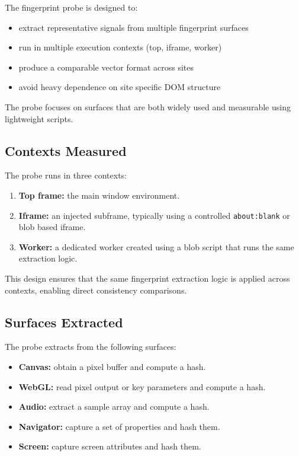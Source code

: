 \documentclass[11pt]{report}
\begin{document}
The fingerprint probe is designed to:

\begin{itemize}
    \item extract representative signals from multiple fingerprint surfaces
    \item run in multiple execution contexts (top, iframe, worker)
    \item produce a comparable vector format across sites
    \item avoid heavy dependence on site specific DOM structure
\end{itemize}

The probe focuses on surfaces that are both widely used and measurable using lightweight scripts.

\subsection{Contexts Measured}

The probe runs in three contexts:

\begin{enumerate}
    \item \textbf{Top frame:} the main window environment.
    \item \textbf{Iframe:} an injected subframe, typically using a controlled \texttt{about:blank} or blob based iframe.
    \item \textbf{Worker:} a dedicated worker created using a blob script that runs the same extraction logic.
\end{enumerate}

This design ensures that the same fingerprint extraction logic is applied across contexts, enabling direct consistency comparisons.

\subsection{Surfaces Extracted}

The probe extracts from the following surfaces:

\begin{itemize}
    \item \textbf{Canvas:} obtain a pixel buffer and compute a hash.
    \item \textbf{WebGL:} read pixel output or key parameters and compute a hash.
    \item \textbf{Audio:} extract a sample array and compute a hash.
    \item \textbf{Navigator:} capture a set of properties and hash them.
    \item \textbf{Screen:} capture screen attributes and hash them.
\end{itemize}
\end{document}
